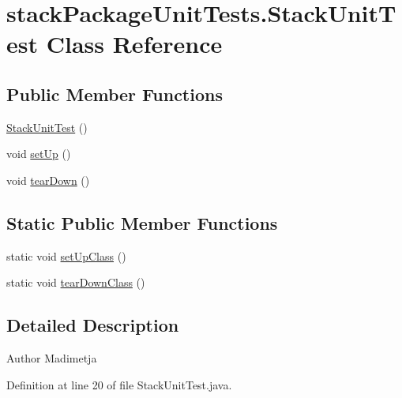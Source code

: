 \hypertarget{classstack_package_unit_tests_1_1_stack_unit_test}{\section{stack\+Package\+Unit\+Tests.\+Stack\+Unit\+Test Class Reference}
\label{classstack_package_unit_tests_1_1_stack_unit_test}
}
\subsection*{Public Member Functions}
\begin{DoxyCompactItemize}
\item 
\hyperlink{classstack_package_unit_tests_1_1_stack_unit_test_ac01ed09cc4839564ab5190194fc2a779}{Stack\+Unit\+Test} ()
\item 
void \hyperlink{classstack_package_unit_tests_1_1_stack_unit_test_a21d7f0fe59add6adeba3968a0efd6665}{set\+Up} ()
\item 
void \hyperlink{classstack_package_unit_tests_1_1_stack_unit_test_a2e35176b63667c6e025495e811b5d473}{tear\+Down} ()
\end{DoxyCompactItemize}
\subsection*{Static Public Member Functions}
\begin{DoxyCompactItemize}
\item 
static void \hyperlink{classstack_package_unit_tests_1_1_stack_unit_test_ab44e5f0e6f4dfcdc89b416109dd7db11}{set\+Up\+Class} ()
\item 
static void \hyperlink{classstack_package_unit_tests_1_1_stack_unit_test_ab065aabd4484126579c30a5ab4acb941}{tear\+Down\+Class} ()
\end{DoxyCompactItemize}


\subsection{Detailed Description}
\begin{DoxyAuthor}{Author}
Madimetja 
\end{DoxyAuthor}


Definition at line 20 of file Stack\+Unit\+Test.\+java.



